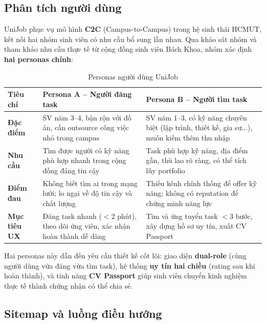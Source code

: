 
\subsection{Phân tích người dùng}

UniJob phục vụ mô hình \textbf{C2C} (Campus-to-Campus) trong hệ sinh thái HCMUT, kết nối
hai nhóm sinh viên có nhu cầu bổ sung lẫn nhau. Qua khảo sát nhóm và tham khảo nhu cầu
thực tế từ cộng đồng sinh viên Bách Khoa, nhóm xác định \textbf{hai personas chính}:

\begin{table}[H]
\centering
\caption{Personas người dùng UniJob}
\renewcommand{\arraystretch}{1.2}
\begin{tabularx}{\textwidth}{|p{3.2cm}|X|X|}
\hline
\textbf{Tiêu chí} & \textbf{Persona A -- Người đăng task} & \textbf{Persona B -- Người tìm task} \\
\hline
\textbf{Đặc điểm} & SV năm 3--4, bận rộn với đồ án, cần outsource công việc nhỏ trong campus &
  SV năm 1--3, có kỹ năng chuyên biệt (lập trình, thiết kế, gia sư...), muốn kiếm thêm thu nhập \\
\hline
\textbf{Nhu cầu} & Tìm được người có kỹ năng phù hợp nhanh trong cộng đồng đáng tin cậy &
  Task phù hợp kỹ năng, địa điểm gần, thù lao rõ ràng, có thể tích lũy portfolio \\
\hline
\textbf{Điểm đau} & Không biết tìm ai trong mạng lưới; lo ngại về độ tin cậy và chất lượng &
  Thiếu kênh chính thống để offer kỹ năng; không có reputation để chứng minh năng lực \\
\hline
\textbf{Mục tiêu UX} & Đăng task nhanh ($<$2 phút), theo dõi ứng viên, xác nhận hoàn thành dễ dàng &
  Tìm và ứng tuyển task $<$3 bước, xây dựng hồ sơ uy tín, xuất CV Passport \\
\hline
\end{tabularx}
\end{table}

Hai personas này dẫn đến yêu cầu thiết kế cốt lõi: giao diện \textbf{dual-role} (cùng
người dùng vừa đăng vừa tìm task), hệ thống \textbf{uy tín hai chiều} (rating sau khi
hoàn thành), và tính năng \textbf{CV Passport} giúp sinh viên chuyển kinh nghiệm thực
tế thành chứng nhận có thể chia sẻ.

\subsection{Sitemap và luồng điều hướng}

